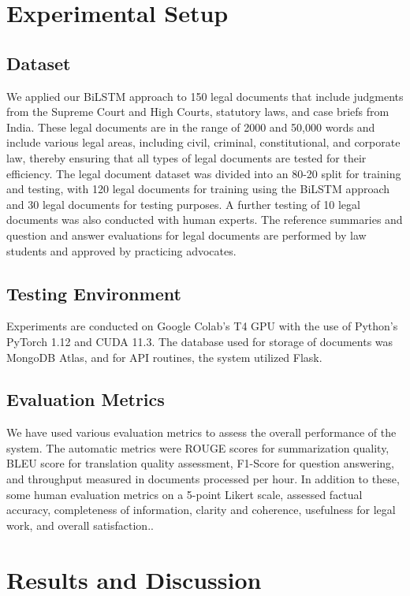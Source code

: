 \documentclass{llncs}
\begin{document}
\section{Experimental Setup}

\subsection{Dataset}

We applied our BiLSTM approach to 150 legal documents that include judgments from the Supreme Court and High Courts, statutory laws, and case briefs from India. These legal documents are in the range of 2000 and 50,000 words and include various legal areas, including civil, criminal, constitutional, and corporate law, thereby ensuring that all types of legal documents are tested for their efficiency. The legal document dataset was divided into an 80-20 split for training and testing, with 120 legal documents for training using the BiLSTM approach and 30 legal documents for testing purposes. A further testing of 10 legal documents was also conducted with human experts. The reference summaries and question and answer evaluations for legal documents are performed by law students and approved by practicing advocates.

\subsection{Testing Environment}

Experiments are conducted on Google Colab’s T4 GPU with the use of Python’s PyTorch 1.12 and CUDA 11.3. The database used for storage of documents was MongoDB Atlas, and for API routines, the system utilized Flask.

\subsection{Evaluation Metrics}

We have used various evaluation metrics to assess the overall performance of the system. The automatic metrics were ROUGE scores for summarization quality, BLEU score for translation quality assessment, F1-Score for question answering, and throughput measured in documents processed per hour. In addition to these, some human evaluation metrics on a 5-point Likert scale, assessed factual accuracy, completeness of information, clarity and coherence, usefulness for legal work, and overall satisfaction..

\section{Results and Discussion}
\end{document}
